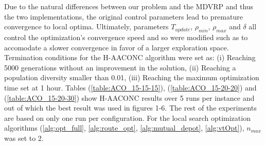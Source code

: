 \documentclass{article}
\begin{document}
	Due to the natural differences between our problem and the MDVRP and thus the two implementations, the original control parameters lead to premature convergence to local optima. Ultimately, parameters $T_{update}$, $\rho_{min}$, $\rho_{max}$ and $\delta$ all control the optimization's convergence speed and so were modified such as to accomodate a slower convergence in favor of a larger exploration space. Termination conditions for the H-AACONC algorithm were set as: (i) Reaching 5000 generations without an improvement in the solution, (ii) Reaching a population diversity smaller than 0.01, (iii) Reaching the maximum optimization time set at 1 hour. Tables (\ref{table:ACO_15-15-15}), (\ref{table:ACO_15-20-20}) and (\ref{table:ACO_15-20-30}) show H-AACONC results over 5 runs per instance and out of which the best result was used in figures 1-6. The rest of the experiments are based on only one run per configuration.
	For the local search optimization algorithms (\ref{alg:opt_full}, \ref{alg:route_opt}, \ref{alg:mutual_depot}, \ref{alg:vtOpt}), $n_{max}$ was set to 2.
	\par
\end{document}
